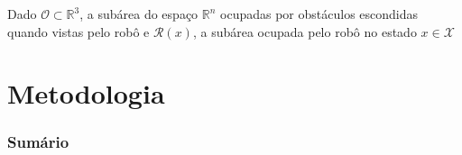 \documentclass{beamer}
\begin{document}
\begin{frame}[allowframebreaks]
\begin{itemize}
		Dado $\mathcal{O} \subset \mathbb{R}^3$, a subárea do espaço $\mathbb{R}^n$ ocupadas por obstáculos escondidas quando vistas pelo robô e $\mathcal{R}(x)$, a subárea ocupada pelo robô no estado $x \in \mathcal{X}$
			
		
		
	\end{itemize}	 
\end{frame}


\section{Metodologia}

\begin{frame}
	\frametitle{Sumário}
	\tableofcontents[currentsection]
\end{frame}
\end{document}

